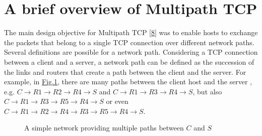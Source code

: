 \documentclass[letterpaper,10pt,english]{sphinxmanual}
\begin{document}
\section{A brief overview of Multipath TCP}
\label{\detokenize{mptcp:a-brief-overview-of-multipath-tcp}}\label{\detokenize{mptcp:mptcp-overview}}
\sphinxAtStartPar
The main design objective for Multipath TCP {[}\hyperlink{cite.biblio:id6658}{8}{]} was to enable hosts to exchange the packets that belong to a single TCP connection over different network paths. Several definitions are possible for a network path. Considering a TCP connection between a client and a server, a network path can be defined as the succession of the links and routers that create a path between the client and the server. For example, in \hyperref[\detokenize{mptcp:fig-simple-network}]{Fig.\@ \ref{\detokenize{mptcp:fig-simple-network}}}, there are many paths between the client host  and the server , e.g. \(C \rightarrow R1 \rightarrow R2 \rightarrow R4 \rightarrow S\) and \(C \rightarrow R1 \rightarrow R3 \rightarrow R4 \rightarrow S\), but also \(C \rightarrow R1 \rightarrow R3 \rightarrow R5 \rightarrow R4 \rightarrow S\) or even \(C \rightarrow R1 \rightarrow R2 \rightarrow R4 \rightarrow R3 \rightarrow R5 \rightarrow R4 \rightarrow S\).
\begin{figure}[htbp]\centering\capstart{}\caption{A simple network providing multiple paths between \(C\) and \(S\)}\label{\detokenize{mptcp:id52}}\label{\detokenize{mptcp:fig-simple-network}}\end{figure}
\sphinxAtStartPar
\end{document}
